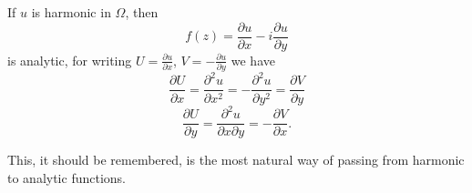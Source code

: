 If $u$ is harmonic in $\Omega$, then
\begin{equation*}
f (z) = \frac {\partial u}{\partial x} - i \frac {\partial u}{\partial y}\tag{55}\label{eq:4.55}
\end{equation*}
is analytic, for writing $U = \frac{\partial u}{\partial x}$, $V = -\frac{\partial u}{\partial y}$ we have
\begin{equation*}
\frac {\partial U}{\partial x} = \frac {\partial^ {2} u}{\partial x ^ {2}} = - \frac {\partial^ {2} u}{\partial y ^ {2}} = \frac {\partial V}{\partial y}
\end{equation*}
\begin{equation*}
\frac {\partial U}{\partial y} = \frac {\partial^ {2} u}{\partial x \partial y} = - \frac {\partial V}{\partial x}.
\end{equation*}
\begingroup\renewcommand{\thefootnote}{}\endgroup

This, it should be remembered, is the most natural way of passing from harmonic to analytic functions.

